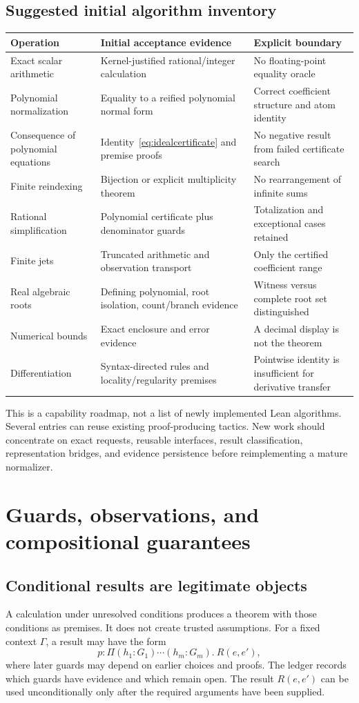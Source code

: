 \documentclass[11pt,a4paper]{article}
\theoremstyle{definition}
\begin{document}
\subsection{Suggested initial algorithm inventory}
\begin{longtable}{@{}P{.24\textwidth}P{.37\textwidth}P{.31\textwidth}@{}}
\toprule
Operation & Initial acceptance evidence & Explicit boundary \\
\midrule
\endhead
Exact scalar arithmetic & Kernel-justified rational/integer calculation & No floating-point equality oracle \\
Polynomial normalization & Equality to a reified polynomial normal form & Correct coefficient structure and atom identity \\
Consequence of polynomial equations & Identity~\eqref{eq:idealcertificate} and premise proofs & No negative result from failed certificate search \\
Finite reindexing & Bijection or explicit multiplicity theorem & No rearrangement of infinite sums \\
Rational simplification & Polynomial certificate plus denominator guards & Totalization and exceptional cases retained \\
Finite jets & Truncated arithmetic and observation transport & Only the certified coefficient range \\
Real algebraic roots & Defining polynomial, root isolation, count/branch evidence & Witness versus complete root set distinguished \\
Numerical bounds & Exact enclosure and error evidence & A decimal display is not the theorem \\
Differentiation & Syntax-directed rules and locality/regularity premises & Pointwise identity is insufficient for derivative transfer \\
\bottomrule
\end{longtable}
This is a capability roadmap, not a list of newly implemented Lean algorithms.
Several entries can reuse existing proof-producing tactics. New work should
concentrate on exact requests, reusable interfaces, result classification,
representation bridges, and evidence persistence before reimplementing a mature
normalizer.

\section{Guards, observations, and compositional guarantees}
\label{sec:composition}
\subsection{Conditional results are legitimate objects}
A calculation under unresolved conditions produces a theorem with those
conditions as premises. It does not create trusted assumptions. For a fixed
context $\Gamma$, a result may have the form
\[
 p:\Pi(h_1:G_1)\cdots(h_m:G_m).\ R(e,e'),
\]
where later guards may depend on earlier choices and proofs. The ledger records
which guards have evidence and which remain open. The result $R(e,e')$ can be
used unconditionally only after the required arguments have been supplied.
\end{document}
